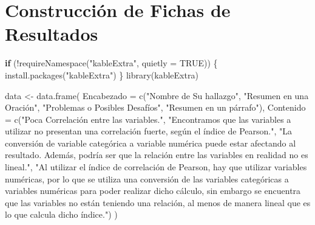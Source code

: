 \documentclass[
  letterpaper,
  DIV=11,
  numbers=noendperiod]{scrreprt}
\newenvironment{Shaded}{\begin{snugshade}}{\end{snugshade}}
\newcommand{\AttributeTok}[1]{\textcolor[rgb]{0.40,0.45,0.13}{#1}}
\newcommand{\ConstantTok}[1]{\textcolor[rgb]{0.56,0.35,0.01}{#1}}
\newcommand{\ControlFlowTok}[1]{\textcolor[rgb]{0.00,0.23,0.31}{\textbf{#1}}}
\newcommand{\FunctionTok}[1]{\textcolor[rgb]{0.28,0.35,0.67}{#1}}
\newcommand{\NormalTok}[1]{\textcolor[rgb]{0.00,0.23,0.31}{#1}}
\newcommand{\OtherTok}[1]{\textcolor[rgb]{0.00,0.23,0.31}{#1}}
\newcommand{\SpecialCharTok}[1]{\textcolor[rgb]{0.37,0.37,0.37}{#1}}
\newcommand{\StringTok}[1]{\textcolor[rgb]{0.13,0.47,0.30}{#1}}
\begin{document}
\section{Construcción de Fichas de
Resultados}\label{construcciuxf3n-de-fichas-de-resultados}

\begin{Shaded}
\begin{Highlighting}[]
\ControlFlowTok{if}\NormalTok{ (}\SpecialCharTok{!}\FunctionTok{requireNamespace}\NormalTok{(}\StringTok{"kableExtra"}\NormalTok{, }\AttributeTok{quietly =} \ConstantTok{TRUE}\NormalTok{)) \{}
  \FunctionTok{install.packages}\NormalTok{(}\StringTok{"kableExtra"}\NormalTok{)}
\NormalTok{\}}
\FunctionTok{library}\NormalTok{(kableExtra)}


\NormalTok{data }\OtherTok{\textless{}{-}} \FunctionTok{data.frame}\NormalTok{(}
  \AttributeTok{Encabezado =} \FunctionTok{c}\NormalTok{(}\StringTok{"Nombre de Su hallazgo"}\NormalTok{, }
                 \StringTok{"Resumen en una Oración"}\NormalTok{, }
                 \StringTok{"Problemas o Posibles Desafíos"}\NormalTok{, }
                 \StringTok{"Resumen en un párrafo"}\NormalTok{),}
  \AttributeTok{Contenido =} \FunctionTok{c}\NormalTok{(}\StringTok{"Poca Correlación entre las variables."}\NormalTok{, }
                \StringTok{"Encontramos que las variables a utilizar no presentan una correlación fuerte, según el índice de Pearson."}\NormalTok{, }
                \StringTok{"La conversión de variable categórica a variable numérica puede estar afectando al resultado. Además, podría ser que la relación entre las variables en realidad no es lineal."}\NormalTok{, }
                \StringTok{"Al utilizar el índice de correlación de Pearson, hay que utilizar variables numéricas, por lo que se utiliza una conversión de las variables categóricas a variables numéricas para poder realizar dicho cálculo, sin embargo se encuentra que las variables no están teniendo una relación, al menos de manera lineal que es lo que calcula dicho índice."}\NormalTok{)}
\NormalTok{)}



\end{Highlighting}
\end{Shaded}
\end{document}
